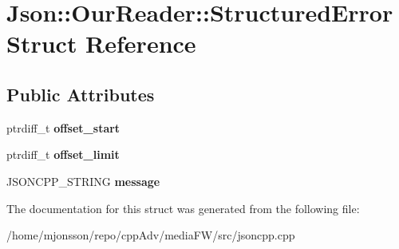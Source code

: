 \hypertarget{structJson_1_1OurReader_1_1StructuredError}{}\section{Json\+:\+:Our\+Reader\+:\+:Structured\+Error Struct Reference}
\label{structJson_1_1OurReader_1_1StructuredError}
\subsection*{Public Attributes}
\begin{DoxyCompactItemize}
\item 
\mbox{\label{structJson_1_1OurReader_1_1StructuredError_a102677698afb8177c985e72dafe72b15}} 
ptrdiff\+\_\+t {\bfseries offset\+\_\+start}
\item 
\mbox{\label{structJson_1_1OurReader_1_1StructuredError_a15491a751a39c5153af04e68b1d0abb9}} 
ptrdiff\+\_\+t {\bfseries offset\+\_\+limit}
\item 
\mbox{\label{structJson_1_1OurReader_1_1StructuredError_a9d0b9986bf765d067dfcf2f971a450d1}} 
J\+S\+O\+N\+C\+P\+P\+\_\+\+S\+T\+R\+I\+NG {\bfseries message}
\end{DoxyCompactItemize}


The documentation for this struct was generated from the following file\+:\begin{DoxyCompactItemize}
\item 
/home/mjonsson/repo/cpp\+Adv/media\+F\+W/src/jsoncpp.\+cpp\end{DoxyCompactItemize}
